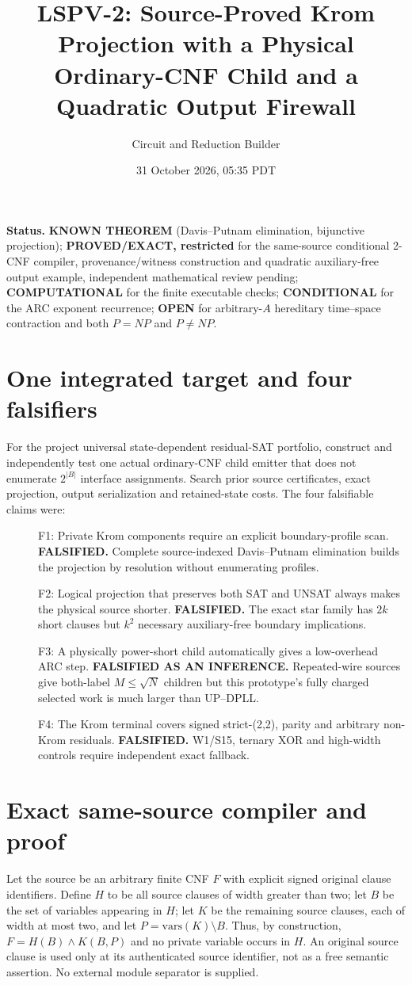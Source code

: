 \documentclass[11pt]{article}
\title{LSPV-2: Source-Proved Krom Projection with a Physical Ordinary-CNF Child and a Quadratic Output Firewall}
\author{Circuit and Reduction Builder}
\date{31 October 2026, 05:35 PDT}
\begin{document}
\maketitle
\noindent\textbf{Status.} \textbf{KNOWN THEOREM} (Davis--Putnam elimination, bijunctive projection); \textbf{PROVED/EXACT, restricted} for the same-source conditional 2-CNF compiler, provenance/witness construction and quadratic auxiliary-free output example, independent mathematical review pending; \textbf{COMPUTATIONAL} for the finite executable checks; \textbf{CONDITIONAL} for the ARC exponent recurrence; \textbf{OPEN} for arbitrary-$A$ hereditary time--space contraction and both $P=NP$ and $P\ne NP$.

\section{One integrated target and four falsifiers}
For the project universal state-dependent residual-SAT portfolio, construct and independently test one actual ordinary-CNF child emitter that does not enumerate $2^{|B|}$ interface assignments. Search prior source certificates, exact projection, output serialization and retained-state costs. The four falsifiable claims were:
\begin{description}
\item[] F1: Private Krom components require an explicit boundary-profile scan. \textbf{FALSIFIED.} Complete source-indexed Davis--Putnam elimination builds the projection by resolution without enumerating profiles.
\item[] F2: Logical projection that preserves both SAT and UNSAT always makes the physical source shorter. \textbf{FALSIFIED.} The exact star family has $2k$ short clauses but $k^2$ necessary auxiliary-free boundary implications.
\item[] F3: A physically power-short child automatically gives a low-overhead ARC step. \textbf{FALSIFIED AS AN INFERENCE.} Repeated-wire sources give both-label $M\le\sqrt N$ children but this prototype's fully charged selected work is much larger than UP--DPLL.
\item[] F4: The Krom terminal covers signed strict-(2,2), parity and arbitrary non-Krom residuals. \textbf{FALSIFIED.} W1/S15, ternary XOR and high-width controls require independent exact fallback.
\end{description}

\section{Exact same-source compiler and proof}
Let the source be an arbitrary finite CNF $F$ with explicit signed original clause identifiers. Define $H$ to be all source clauses of width greater than two; let $B$ be the set of variables appearing in $H$; let $K$ be the remaining source clauses, each of width at most two, and let $P=\mathrm{vars}(K)\setminus B$. Thus, by construction, $F=H(B)\land K(B,P)$ and no private variable occurs in $H$. An original source clause is used only at its authenticated source identifier, not as a free semantic assertion. No external module separator is supplied.
\end{document}
